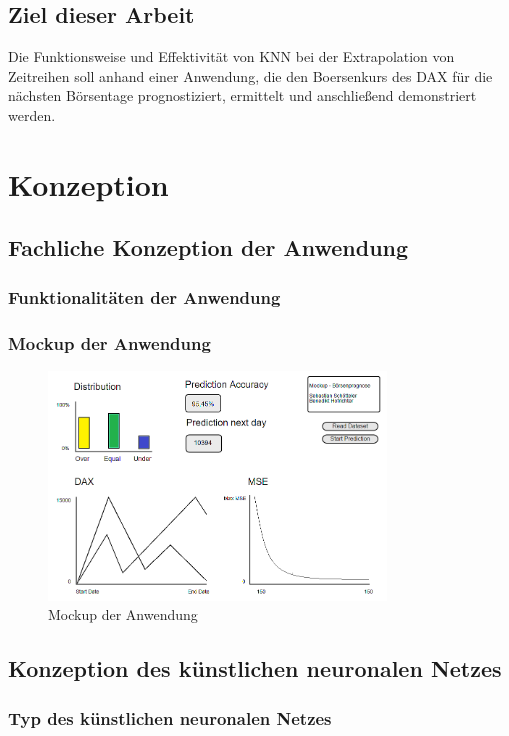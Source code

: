 \documentclass[a4paper,DIV11,bibliography=totoc,headings=normal,ngerman,headsepline]{scrreprt}
\begin{document}
\section{Ziel dieser Arbeit}
Die Funktionsweise und Effektivität von KNN bei der Extrapolation von Zeitreihen soll anhand einer Anwendung, die den Boersenkurs des DAX für die nächsten Börsentage prognostiziert, ermittelt und anschließend demonstriert werden.
 
\chapter{Konzeption} %
\section{Fachliche Konzeption der Anwendung} %
\subsection{Funktionalitäten der Anwendung} %
\subsection{Mockup der Anwendung} %

\begin{figure}[htbp]
\centering
		\includegraphics[width=0.80\textwidth]{mockup.PNG}
	\caption{Mockup der Anwendung}
	\label{fig:Mockup der Anwendung}
\end{figure}


\section{Konzeption des künstlichen neuronalen Netzes} %
\subsection{Typ des künstlichen neuronalen Netzes} %
\end{document}
